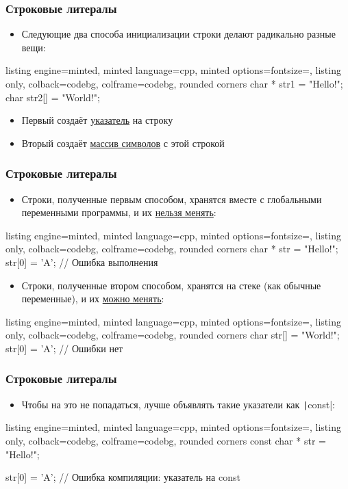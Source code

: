 \documentclass[10pt]{beamer}
\begin{document}
\begin{frame}[fragile]
\frametitle{Строковые литералы}
\begin{itemize}
\item Следующие два способа инициализации строки делают радикально разные вещи:
\end{itemize}
\begin{tcblisting}{listing engine=minted, minted language=cpp, minted options={fontsize=\scriptsize}, listing only, colback=codebg, colframe=codebg, rounded corners}
char * str1 = "Hello!";
char str2[] = "World!";
\end{tcblisting}
\pause
{}
\begin{itemize}
\item Первый создаёт \underline{указатель} на строку
\pause
\item Вторый создаёт \underline{массив символов} с этой строкой
\end{itemize}
\end{frame}

\begin{frame}[fragile]
\frametitle{Строковые литералы}
\begin{itemize}
\item Строки, полученные первым способом, хранятся вместе с глобальными переменными программы, и их \underline{нельзя менять}:
\end{itemize}
\begin{tcblisting}{listing engine=minted, minted language=cpp, minted options={fontsize=\scriptsize}, listing only, colback=codebg, colframe=codebg, rounded corners}
char * str = "Hello!";
str[0] = 'A'; // Ошибка выполнения
\end{tcblisting}
\pause
\begin{itemize}
\item Строки, полученные втором способом, хранятся на стеке (как обычные переменные), и их \underline{можно менять}:
\end{itemize}
\begin{tcblisting}{listing engine=minted, minted language=cpp, minted options={fontsize=\scriptsize}, listing only, colback=codebg, colframe=codebg, rounded corners}
char str[] = "World!";
str[0] = 'A'; // Ошибки нет
\end{tcblisting}
\end{frame}

\begin{frame}[fragile]
\frametitle{Строковые литералы}
\begin{itemize}
\item Чтобы на это не попадаться, лучше объявлять такие указатели как \texttt|const|:
\end{itemize}
\begin{tcblisting}{listing engine=minted, minted language=cpp, minted options={fontsize=\scriptsize}, listing only, colback=codebg, colframe=codebg, rounded corners}
const char * str = "Hello!";

str[0] = 'A'; // Ошибка компиляции: указатель на const
\end{tcblisting}
\end{frame}
\end{document}
